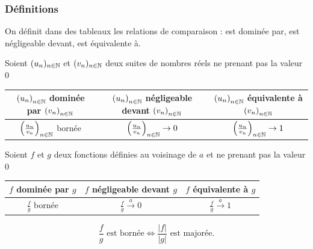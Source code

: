 \subsubsection{Définitions}
On définit dans des tableaux les relations de comparaison : \og est dominée par\fg, \og est négligeable devant\fg, \og est équivalente à\fg.
\begin{defi}
 Soient $(u_n)_{n\in \mathbb{N}}$ et $(v_n)_{n\in \mathbb{N}}$ deux suites de nombres réels ne prenant pas la valeur $0$
 
\begin{center}
\renewcommand{\arraystretch}{2}
\begin{tabular}{|c|c|c|}\hline
$\left( u_n \right)_{n \in \mathbb{N}}$ dominée par $\left( v_n \right)_{n \in \mathbb{N}}$ & 
$\left( u_n \right)_{n \in \mathbb{N}}$ négligeable devant $\left( v_n \right)_{n \in \mathbb{N}}$& 
$\left( u_n \right)_{n \in \mathbb{N}}$ équivalente à $\left( v_n \right)_{n \in \mathbb{N}}$\\ \hline
$\left(\frac{u_n}{v_n} \right)_{n\in \mathbb{N}}$ bornée & 
$\left(\frac{u_n}{v_n} \right)_{n\in \mathbb{N}} \rightarrow 0$& 
$\left(\frac{u_n}{v_n} \right)_{n\in \mathbb{N}} \rightarrow 1$ \\ \hline
 \end{tabular}
 \end{center}

\end{defi}

\begin{defi}
 Soient $f$ et $g$ deux fonctions définies au voisinage de $a$ et ne prenant pas la valeur $0$
\begin{center}
\renewcommand{\arraystretch}{2}
\begin{tabular}{|c|c|c|}\hline
$f$ dominée par $g$ & 
$f$ négligeable devant $g$& 
$f$ équivalente à $g$\\ \hline
$\frac{f}{g}$ bornée & 
$\frac{f}{g} \xrightarrow{a} 0$& 
$\frac{f}{g} \xrightarrow{a} 1$ \\ \hline
 \end{tabular}
 \end{center}
\end{defi}
\begin{rem}
\begin{displaymath}
 \frac{f}{g}  \text{ est bornée} \Leftrightarrow \frac{|f|}{|g|}  \text{ est majorée.}
\end{displaymath} 
\end{rem}

